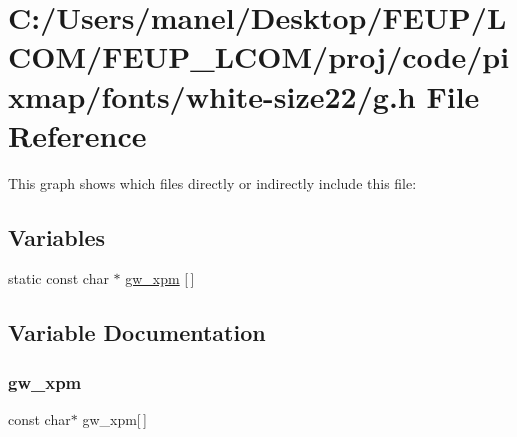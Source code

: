 \hypertarget{white-size22_2g_8h}{}\section{C\+:/\+Users/manel/\+Desktop/\+F\+E\+U\+P/\+L\+C\+O\+M/\+F\+E\+U\+P\+\_\+\+L\+C\+O\+M/proj/code/pixmap/fonts/white-\/size22/g.h File Reference}
\label{white-size22_2g_8h}
This graph shows which files directly or indirectly include this file\+:
\subsection*{Variables}
\begin{DoxyCompactItemize}
\item 
static const char $\ast$ \mbox{\hyperlink{white-size22_2g_8h_a95a6ad6d0d4416f8442e6143b1a8226b}{gw\+\_\+xpm}} \mbox{[}$\,$\mbox{]}
\end{DoxyCompactItemize}


\subsection{Variable Documentation}
\mbox{\label{white-size22_2g_8h_a95a6ad6d0d4416f8442e6143b1a8226b}} 
\subsubsection{\texorpdfstring{gw\_xpm}{gw\_xpm}}
{\footnotesize\ttfamily const char$\ast$ gw\+\_\+xpm\mbox{[}$\,$\mbox{]}\hspace{0.3cm}{\ttfamily [static]}}

